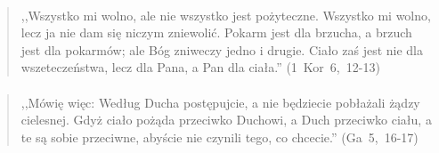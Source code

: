 \documentclass[10pt,a4paper,oneside]{article}
\begin{document}
\paragraph{}
\begin{quote}
,,Wszystko mi wolno, ale nie wszystko jest pożyteczne. Wszystko mi wolno, lecz ja nie dam się niczym zniewolić. Pokarm jest dla brzucha, a brzuch jest dla pokarmów; ale Bóg zniweczy jedno i drugie. Ciało zaś jest nie dla wszeteczeństwa, lecz dla Pana, a Pan dla ciała.'' \mbox{(1 Kor 6, 12-13)}
\end{quote}
\paragraph{}
\begin{quote}
,,Mówię więc: Według Ducha postępujcie, a nie będziecie pobłażali żądzy cielesnej. Gdyż ciało pożąda przeciwko Duchowi, a Duch przeciwko ciału, a te są sobie przeciwne, abyście nie czynili tego, co chcecie.'' \mbox{(Ga 5, 16-17)}
\end{quote}
\end{document}

